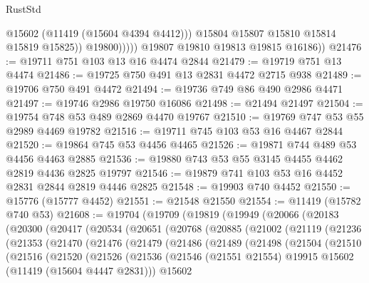 \begin{lexlean}{RustStd}
\begin{coremodule}
                        @15602
                        (@11419 (@15604 @4394 @4412)))
                      @15804
                      @15807
                      @15810
                      @15814
                      @15819
                      @15825))
                  @19800)))))
        @19807
        @19810
        @19813
        @19815
        @16186))
@21476 := @19711 @751 @103 @13 @16 @4474 @2844
@21479 := @19719 @751 @13 @4474
@21486 := @19725 @750 @491 @13 @2831 @4472 @2715 @938
@21489 := @19706 @750 @491 @4472
@21494 := @19736 @749 @86 @490 @2986 @4471
@21497 := @19746 @2986 @19750 @16086
@21498 := @21494 @21497
@21504 := @19754 @748 @53 @489 @2869 @4470 @19767
@21510 := @19769 @747 @53 @55 @2989 @4469 @19782
@21516 := @19711 @745 @103 @53 @16 @4467 @2844
@21520 := @19864 @745 @53 @4456 @4465
@21526 := @19871 @744 @489 @53 @4456 @4463 @2885
@21536 := @19880 @743 @53 @55 @3145 @4455 @4462 @2819 @4436 @2825 @19797
@21546 := @19879 @741 @103 @53 @16 @4452 @2831 @2844 @2819 @4446 @2825
@21548 := @19903 @740 @4452
@21550 := @15776 (@15777 @4452)
@21551 := @21548 @21550
@21554 := @11419 (@15782 @740 @53)
@21608 := @19704
    (@19709
      (@19819
        (@19949
          (@20066
            (@20183
              (@20300
                (@20417
                  (@20534
                    (@20651
                      (@20768
                        (@20885
                          (@21002
                            (@21119
                              (@21236
                                (@21353
                                  (@21470
                                    (@21476
                                      (@21479
                                        (@21486
                                          (@21489
                                            (@21498
                                              (@21504
                                                (@21510
                                                  (@21516
                                                    (@21520
                                                      (@21526
                                                        (@21536
                                                          (@21546
                                                            (@21551 @21554)
                                                            @19915
                                                            @15602
                                                            (@11419 (@15604 @4447 @2831)))
                                                          @15602

\end{coremodule}
\end{lexlean}

